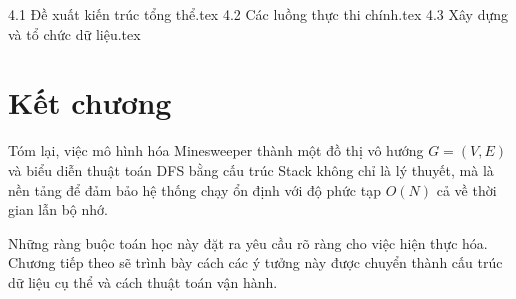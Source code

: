 

{4.1 Đề xuất kiến trúc tổng thể.tex}
{4.2 Các luồng thực thi chính.tex}
{4.3 Xây dựng và tổ chức dữ liệu.tex}

\section{Kết chương}

Tóm lại, việc mô hình hóa Minesweeper thành một đồ thị vô hướng $G = (V, E)$ và biểu diễn thuật toán DFS bằng cấu trúc Stack không chỉ là lý thuyết, mà là nền tảng để đảm bảo hệ thống chạy ổn định với độ phức tạp $O(N)$ cả về thời gian lẫn bộ nhớ.

Những ràng buộc toán học này đặt ra yêu cầu rõ ràng cho việc hiện thực hóa. Chương tiếp theo sẽ trình bày cách các ý tưởng này được chuyển thành cấu trúc dữ liệu cụ thể và cách thuật toán vận hành.

